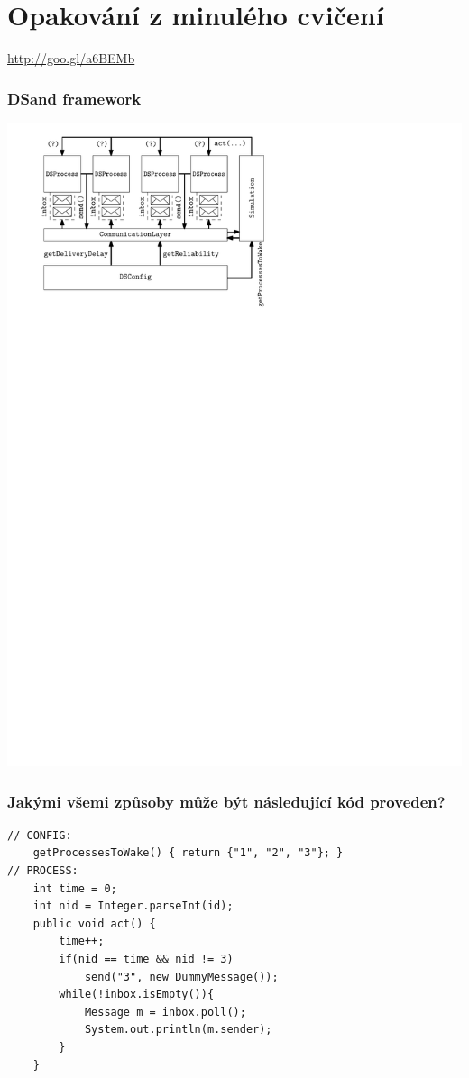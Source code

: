 \documentclass[usenames,dvipsnames,9pt]{beamer}
\begin{document}
\section{Opakování z minulého cvičení}

\begin{frame}[standout]
 \Huge
 \url{http://goo.gl/a6BEMb}
\end{frame}

\begin{frame}
\frametitle{DSand framework}
\centering\includegraphics[width=0.8\linewidth]{10/figs/dsand.pdf}
\end{frame}

{
\begin{frame}[fragile]
\frametitle{Jakými všemi způsoby může být následující kód proveden?}

\begin{verbatim}
// CONFIG:
	getProcessesToWake() { return {"1", "2", "3"}; }
// PROCESS:
	int time = 0;
	int nid = Integer.parseInt(id);
	public void act() {
		time++;
		if(nid == time && nid != 3)
			send("3", new DummyMessage());
		while(!inbox.isEmpty()){
			Message m = inbox.poll();
			System.out.println(m.sender);
		}
	}
\end{verbatim}
\end{frame}
}
\end{document}
